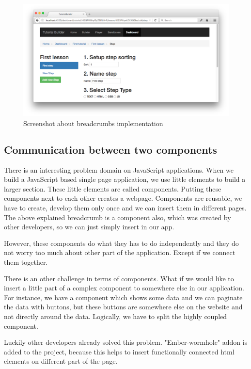 \documentclass[11pt, a4paper, oneside, openright, medskipamount]{report}
\begin{document}
\begin{figure}[ht]
\centering
\includegraphics[width=1\textwidth]{assets/breadcrumb-screenshot.png}
\caption{Screenshot about breadcrumbs implementation}
\label{fig:breadcrumb-screenshot}
\end{figure}

\subsection{Communication between two components}

There is an interesting problem domain on JavaScript applications. When we build a JavaScript based single page application, we use little elements to build a larger section. These little elements are called components. Putting these components next to each other creates a webpage. Components are reusable, we have to create, develop them only once and we can insert them in different pages. The above explained breadcrumb is a component also, which was created by other developers, so we can just simply insert in our app.

However, these components do what they has to do independently and they do not worry too much about other part of the application. Except if we connect them together.

There is an other challenge in terms of components. What if we would like to insert a little part of a complex component to somewhere else in our application. For instance, we have a component which shows some data and we can paginate the data with buttons, but these buttons are somewhere else on the website and not directly around the data. Logically, we have to split the highly coupled component.

Luckily other developers already solved this problem. "Ember-wormhole" addon is added to the project, because this helps to insert functionally connected html elements on different part of the page.
\end{document}
